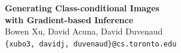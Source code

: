 \documentclass[landscape,a0b,final,a4resizeable]{include/a0poster}
\begin{document}
\begin{poster}
\begin{center}
\begin{pcolumn}{0.99}
{%
%
%
\hspace{-5.0cm}
\begin{minipage}[c][9cm][c]{0.94\textwidth}
  \begin{center}
    \vspace{3.5cm}
    {\sffamily \VeryHuge \textbf{Generating Class-conditional Images\\\vspace{5.0mm} with Gradient-based Inference}}\\[10mm]
    {\huge\sffamily \Huge Bowen Xu, David Acuna, David Duvenaud\\[7.5mm]
    \Large \texttt{\{xubo3, davidj, duvenaud\}@cs.toronto.edu}
    }
  \end{center}
\end{minipage}
%
%
% 
%

}
\end{pcolumn}
\end{center}

\vspace*{2.5cm}

\large





\end{poster}
\end{document}
